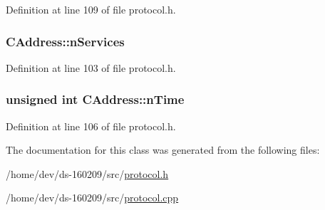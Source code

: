 Definition at line 109 of file protocol.\+h.

\hypertarget{class_c_address_a6a4a6aa020d0d558f238c7d04dd986c3}{}
\subsubsection[{n\+Services}]{ C\+Address\+::n\+Services}\label{class_c_address_a6a4a6aa020d0d558f238c7d04dd986c3}


Definition at line 103 of file protocol.\+h.

\hypertarget{class_c_address_ac1c44aac968b11f90ce529b133ae4e9b}{}
\subsubsection[{n\+Time}]{\setlength{\rightskip}{0pt plus 5cm}unsigned int C\+Address\+::n\+Time}\label{class_c_address_ac1c44aac968b11f90ce529b133ae4e9b}


Definition at line 106 of file protocol.\+h.



The documentation for this class was generated from the following files\+:\begin{DoxyCompactItemize}
\item 
/home/dev/ds-\/160209/src/\hyperlink{protocol_8h}{protocol.\+h}\item 
/home/dev/ds-\/160209/src/\hyperlink{protocol_8cpp}{protocol.\+cpp}\end{DoxyCompactItemize}
